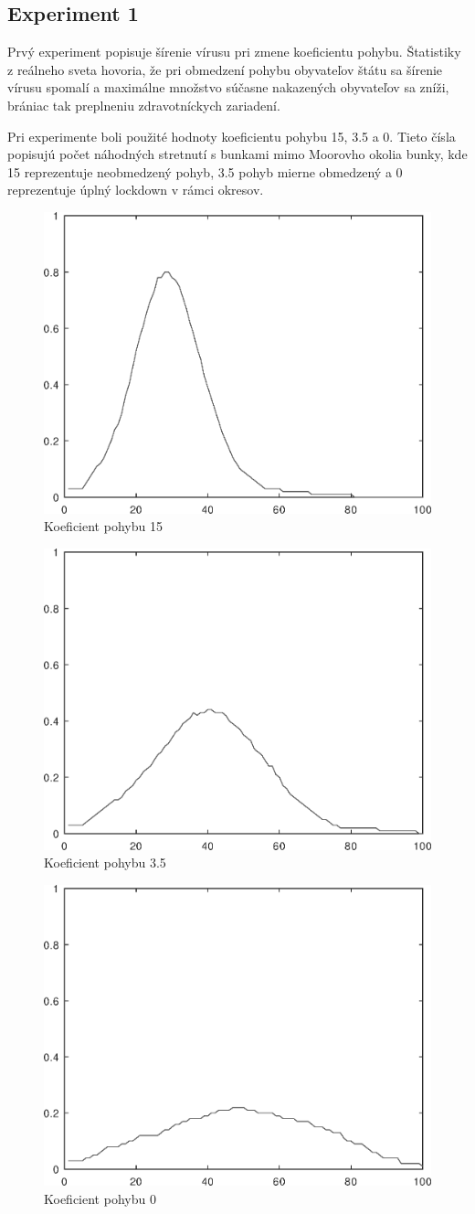 \documentclass[11pt,a4paper,titlepage]{article}
\begin{document}
\subsection{Experiment 1}
Prvý experiment popisuje šírenie vírusu pri zmene koeficientu pohybu. Štatistiky z reálneho sveta hovoria, že pri obmedzení pohybu obyvateľov štátu sa šírenie vírusu spomalí a maximálne množstvo súčasne nakazených obyvateľov sa zníži, brániac tak preplneniu zdravotníckych zariadení.

Pri experimente boli použité hodnoty koeficientu pohybu 15, 3.5 a 0. Tieto čísla popisujú počet náhodných stretnutí s bunkami mimo Moorovho okolia bunky, kde 15 reprezentuje neobmedzený pohyb, 3.5 pohyb mierne obmedzený a 0 reprezentuje úplný lockdown v rámci okresov.

\begin{figure}[h!]
    \center
    \includegraphics[width=.39\linewidth]{movement-rate-15.eps}
    \caption{Koeficient pohybu 15}
\end{figure}

\begin{figure}[h!]
    \center
    \includegraphics[width=.39\linewidth]{movement-rate-3_5.eps}
    \caption{Koeficient pohybu 3.5}
\end{figure}

\begin{figure}[h!]
    \center
    \includegraphics[width=.39\linewidth]{movement-rate-0.eps}
    \caption{Koeficient pohybu 0}
\end{figure}
\end{document}
